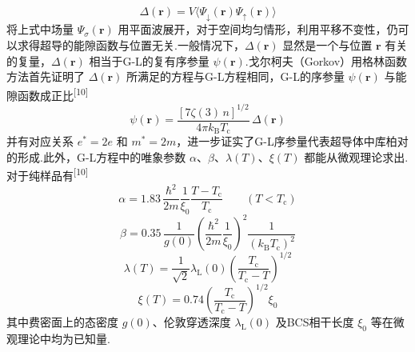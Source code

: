 \begin{equation}
  \Delta(\boldsymbol{r})=V\langle\Psi_{\downarrow}(\boldsymbol{r})
  \Psi_{\uparrow}(\boldsymbol{r})\rangle
\end{equation}
将上式中场量 $\Psi_{\sigma}(\boldsymbol{r})$ 用平面波展开，对于空间均匀情形，利用平移不变性，仍可以求得超导的能隙函数与位置无关.一般情况下，$\Delta(\boldsymbol{r})$ 显然是一个与位置 $\boldsymbol{r}$ 有关的复量，$\Delta(\boldsymbol{r})$ 相当于G-L的复有序参量 $\psi(\boldsymbol{r})$.戈尔柯夫（Gorkov）用格林函数方法首先证明了 $\Delta(\boldsymbol{r})$ 所满足的方程与G-L方程相同，G-L的序参量 $\psi(\boldsymbol{r})$ 与能隙函数成正比\textsuperscript{[10]}
\begin{equation}
  \psi(\boldsymbol{r})=\frac{\left[7\zeta(3)\,n\right]^{1/2}}
  {4\pi k_{\mathrm{B}}T_{\mathrm{c}}}\,\Delta(\boldsymbol{r})
\end{equation}
并有对应关系 $e^{*}=2e$ 和 $m^{*}=2m$，进一步证实了G-L序参量代表超导体中库柏对的形成.此外，G-L方程中的唯象参数 $\alpha$、$\beta$、$\lambda(T)$、$\xi(T)$ 都能从微观理论求出.对于纯样品有\textsuperscript{[10]}
\begin{equation}
  \alpha=1.83\,\frac{\hbar^{2}}{2m}\frac{1}{\xi_{0}}
  \frac{T-T_{\mathrm{c}}}{T_{\mathrm{c}}}
  \qquad\left(T<T_{\mathrm{c}}\right)
\end{equation}
\begin{equation}
  \beta=0.35\,\frac{1}{g(0)}
  \left(\frac{\hbar^{2}}{2m}\frac{1}{\xi_{0}}\right)^{2}
  \frac{1}{\left(k_{\mathrm{B}}T_{\mathrm{c}}\right)^{2}}
\end{equation}
\begin{equation}
  \lambda(T)=\frac{1}{\sqrt{2}}\lambda_{\mathrm{L}}(0)
  \left(\frac{T_{\mathrm{c}}}{T_{\mathrm{c}}-T}\right)^{1/2}
\end{equation}
\begin{equation}
  \xi(T)=0.74\left(\frac{T_{\mathrm{c}}}{T_{\mathrm{c}}-T}\right)^{1/2}\xi_{0}
\end{equation}
其中费密面上的态密度 $g(0)$、伦敦穿透深度 $\lambda_{\mathrm{L}}(0)$ 及BCS相干长度 $\xi_{0}$ 等在微观理论中均为已知量.

